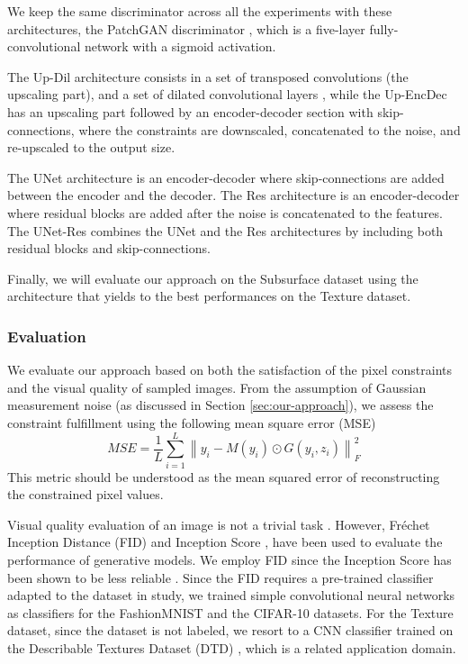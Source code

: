 We keep the same discriminator across all the experiments with these architectures, the PatchGAN discriminator \citep{Isola2016}, which is a five-layer fully-convolutional network with a sigmoid activation.

The Up-Dil architecture consists in a set of transposed convolutions (the upscaling part), and a set of dilated convolutional layers \citep{Yu2015}, while the Up-EncDec has an upscaling part followed by an encoder-decoder section with skip-connections, where the constraints are downscaled, concatenated to the noise, and re-upscaled to the output size.

The UNet \citep{Ronneberger2015} architecture is an encoder-decoder where skip-connections are added between the encoder and the decoder.
The Res architecture is an encoder-decoder where residual blocks \citep{He2015} are added after the noise is concatenated to the features. The UNet-Res combines the UNet and the Res architectures by including both residual blocks and skip-connections.

Finally, we will evaluate our approach on the Subsurface dataset using the architecture that yields to the best performances on the Texture dataset.
%
\subsubsection{Evaluation}

\label{subs:eval}
We evaluate our approach based on both the satisfaction of the pixel constraints and the visual quality of sampled images. From the assumption of Gaussian measurement noise (as discussed in Section \ref{sec:our-approach}), we assess the constraint fulfillment using the following mean square error (MSE) 
\begin{equation}
MSE = \frac{1}{L} \sum_{i=1}^L \left\|y_i - M(y_i) \odot G(y_i, z_i)\right\|_F^2
\end{equation}
This metric should be understood as the mean squared error of reconstructing the constrained pixel values. 

Visual quality evaluation of an image is not a trivial task \citep{Theis2015}. However, Fréchet Inception Distance (FID) \citep{Heusel2017} and Inception Score \citep{Salimans2016}, have been used to evaluate the performance of generative models. We employ FID since the Inception Score has been shown to be less reliable \citep{Barratt2018}. Since the FID requires a pre-trained classifier adapted to the dataset in study, we trained simple convolutional neural networks as classifiers for the FashionMNIST and the CIFAR-10 datasets. For the Texture dataset, since the dataset is not labeled, we resort to a CNN classifier trained on the Describable Textures Dataset (DTD) \citep{Cimpoi2014}, which is a related application domain.

